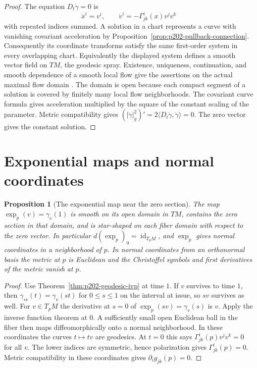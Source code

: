 \documentclass[11pt,oneside,openany]{book}
\theoremstyle{plain}
\newtheorem{proposition}[theorem]{Proposition}
\theoremstyle{definition}
\theoremstyle{remark}
\DeclareMathOperator{\id}{id}
\begin{document}
\begin{proof}
The equation \(D_t\dot\gamma=0\) is
\[
 \dot x^i=v^i,\qquad \dot v^i=-\Gamma^i_{jk}(x)v^jv^k
\]
with repeated indices summed. A solution in a chart represents a
curve with vanishing covariant acceleration by
Proposition~\ref{prop:p202-pullback-connection}. Consequently its
coordinate transforms satisfy the same first-order system in every
overlapping chart. Equivalently the displayed system defines a
smooth vector field on \(TM\), the geodesic spray. Existence,
uniqueness, continuation, and smooth dependence of a smooth local
flow give the assertions on the actual maximal flow domain
\cite[Chapter 6]{P104}\cite[Chapters 3--6]{D13}. The domain is
open because each compact segment of a solution is covered by
finitely many local flow neighborhoods. The covariant curve
formula gives acceleration multiplied by the square of the
constant scaling of the parameter. Metric compatibility gives
\((\lvert\dot\gamma\rvert_g^2)'=2\langle D_t\dot\gamma,\dot\gamma\rangle=0\).
The zero vector gives the constant solution.
\end{proof}

\section{Exponential maps and normal coordinates}\label{p202:G08}

\begin{proposition}[The exponential map near the zero section]
\label{prop:p202-exp-local}
The map \(\exp_p(v)=\gamma_v(1)\) is smooth on its open domain
in \(TM\), contains the zero section in that domain, and is
star-shaped on each fiber domain with respect to the zero vector.
In particular \(d(\exp_p)_0=\id_{T_pM}\), and \(\exp_p\) gives
normal coordinates in a neighborhood of \(p\).
In normal coordinates from an orthonormal basis the metric at \(p\)
is Euclidean and the Christoffel symbols and first derivatives of
the metric vanish at \(p\).
\end{proposition}

\begin{proof}
Use Theorem~\ref{thm:p202-geodesic-ivp} at time \(1\).
If \(v\) survives to time \(1\), then
\(\gamma_{s v}(t)=\gamma_v(st)\) for \(0\leq s\leq1\)
on the interval at issue, so \(sv\) survives as well.
For \(v\in T_pM\) the derivative at \(s=0\) of
\(\exp_p(sv)=\gamma_v(s)\) is \(v\). Apply the inverse function
theorem at \(0\). A sufficiently small open Euclidean ball in the
fiber then maps diffeomorphically onto a normal neighborhood.
In these coordinates the curves \(t\mapsto tv\) are geodesics.
At \(t=0\) this says \(\Gamma^i_{jk}(p)v^jv^k=0\) for all \(v\).
The lower indices are symmetric, hence polarization gives
\(\Gamma^i_{jk}(p)=0\). Metric compatibility in these coordinates
gives \(\partial_i g_{jk}(p)=0\).
\end{proof}
\end{document}
